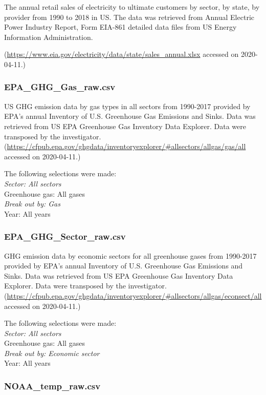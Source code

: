\documentclass[12pt,]{article}
\begin{document}
The annual retail sales of electricity to ultimate customers by sector,
by state, by provider from 1990 to 2018 in US. The data was retrieved
from Annual Electric Power Industry Report, Form EIA-861 detailed data
files from US Energy Information Administration.

(\url{https://www.eia.gov/electricity/data/state/sales_annual.xlsx}
accessed on 2020-04-11.)

\subsubsection{EPA\_GHG\_Gas\_raw.csv}\label{epa_ghg_gas_raw.csv}

US GHG emission data by gas types in all sectors from 1990-2017 provided
by EPA's annual Inventory of U.S. Greenhouse Gas Emissions and Sinks.
Data was retrieved from US EPA Greenhouse Gas Inventory Data Explorer.
Data were transposed by the investigator.\\
(\url{https://cfpub.epa.gov/ghgdata/inventoryexplorer/\#allsectors/allgas/gas/all}
accessed on 2020-04-11.)

The following selections were made:\\
\emph{Sector: All sectors\\
}Greenhouse gas: All gases\\
\emph{Break out by: Gas\\
}Year: All years

\subsubsection{EPA\_GHG\_Sector\_raw.csv}\label{epa_ghg_sector_raw.csv}

GHG emission data by economic sectors for all greenhouse gases from
1990-2017 provided by EPA's annual Inventory of U.S. Greenhouse Gas
Emissions and Sinks. Data was retrieved from US EPA Greenhouse Gas
Inventory Data Explorer. Data were transposed by the investigator.\\
(\url{https://cfpub.epa.gov/ghgdata/inventoryexplorer/\#allsectors/allgas/econsect/all}
accessed on 2020-04-11.)

The following selections were made:\\
\emph{Sector: All sectors\\
}Greenhouse gas: All gases\\
\emph{Break out by: Economic sector\\
}Year: All years

\subsubsection{NOAA\_temp\_raw.csv}\label{noaa_temp_raw.csv}
\end{document}

